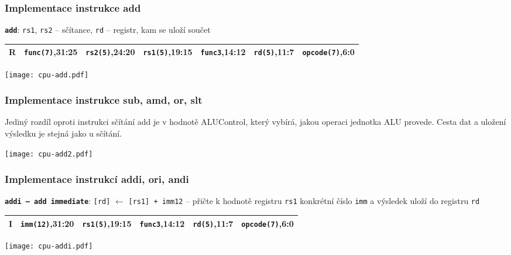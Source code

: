 \documentclass{beamer}
\begin{document}
\begin{frame}[shrink=25]
\frametitle{Implementace instrukce add}

\textbf{\texttt{add}}: \texttt{rs1}, \texttt{rs2} -- sčítance, \texttt{rd} -- registr, kam se uloží součet

\bigskip

\begin{tabular}{|l|l|l|l|l|l|l|}\hline
R & \textbf{\texttt{func(7)}},31:25 & \textbf{\texttt{rs2(5)}},24:20 & \textbf{\texttt{rs1(5)}},19:15 & \textbf{\texttt{func3}},14:12 & \textbf{\texttt{rd(5)}},11:7 & \textbf{\texttt{opcode(7)}},6:0 \\ \hline
\end{tabular}

\bigskip

\texttt{[image: cpu-add.pdf]}

\end{frame}


\begin{frame}
\frametitle{Implementace instrukce sub, amd, or, slt}

Jediný rozdíl oproti instrukci sčítání add je v hodnotě ALUControl, který vybírá, jakou operaci jednotka ALU provede. Cesta dat a uložení výsledku je stejná jako u sčítání.
\bigskip

\bigskip

\texttt{[image: cpu-add2.pdf]}

\end{frame}


\begin{frame}[shrink=10]
\frametitle{Implementace instrukcí addi, ori, andi}

\textbf{\texttt{addi -- add immediate}}: \texttt{[rd]} $\leftarrow$ \texttt{[rs1] + imm12} -- přičte k hodnotě registru \texttt{rs1} konkrétní číslo \texttt{imm} a výsledek uloží do registru \texttt{rd}

\bigskip

\begin{tabular}{|l|l|l|l|l|l|}\hline
I & \textbf{\texttt{imm(12)}},31:20 & \textbf{\texttt{rs1(5)}},19:15 & \textbf{\texttt{func3}},14:12 & \textbf{\texttt{rd(5)}},11:7 & \textbf{\texttt{opcode(7)}},6:0 \\ \hline
\end{tabular}

\bigskip

\texttt{[image: cpu-addi.pdf]}

\end{frame}
\end{document}
